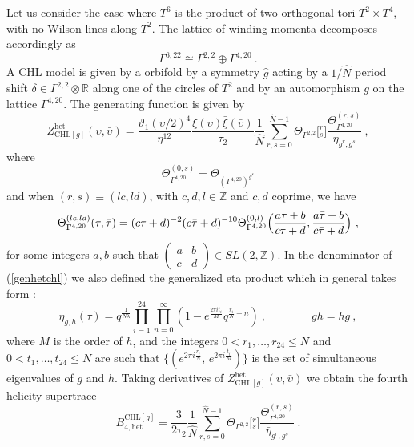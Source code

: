 \documentclass[a4paper,11pt]{article}
\newcommand{\RR}{\mathbb{R}}
\newcommand{\ZZ}{\mathbb{Z}}
\numberwithin{equation}{section}
\def\be{\begin{equation}}
\def\ee{\end{equation}}
\begin{document}
Let us consider the case where $T^6$ is the product of two orthogonal tori $T^2\times T^4$, with no Wilson lines along $T^2$. The lattice of winding momenta  decomposes accordingly as
\be \Gamma^{6,22}\cong \Gamma^{2,2}\oplus \Gamma^{4,20}\ .
\ee A CHL model is given by a orbifold by a symmetry $\hat g$ acting by a $1/\hat N$ period shift $\delta\in \Gamma^{2,2}\otimes \RR$ along one of the circles of $T^2$ and by an automorphism $g$ on the lattice $\Gamma^{4,20}$. The generating function is given by
\be Z^{\text{het}}_{\text{CHL}[g]}(\upsilon,\bar\upsilon)=
\frac{\vartheta_1(\upsilon/2)^4  }{\eta^{12}}\frac{\xi(\upsilon)\bar\xi(\bar\upsilon)}{\tau_2}\frac{1}{\hat N}\sum_{r,s=0}^{\hat N-1}\Theta_{\Gamma^{2,2}}\bigl[{}^{r}_{s}\bigr]\frac{\Theta_{\Gamma^{4,20}}^{(r,s)}}{\bar\eta_{g^r,g^s}}\ ,
\label{genhetchl}
\ee where
\be \Theta_{\Gamma^{4,20}}^{(0,s)}=\Theta_{(\Gamma^{4,20})^{g^s}}
\ee
and when $(r,s)\equiv (lc,ld)$, with $c,d,l\in \ZZ$ and $c,d$ coprime, we have
\be \Theta_{\Gamma^{4,20}}^{(lc,ld)}(\tau,\bar\tau)=(c\tau+d)^{-2}(c\bar \tau+d)^{-10}\Theta_{\Gamma^{4,20}}^{(0,l)}\Bigl(\frac{a\tau+b}{c\tau+d},\frac{a\bar\tau+b}{c\bar\tau+d}\Bigr)\ ,
\ee for some integers $a,b$ such that $\left(\begin{smallmatrix}
a & b\\ c& d
\end{smallmatrix}\right)\in SL(2,\ZZ)$. In the denominator of (\ref{genhetchl}) we also defined the generalized eta product which in general takes form \cite{Persson:2013xpa}:
 \be\label{etagh} \eta_{g,h}(\tau)=q^{\frac{1}{N\lambda}}\prod_{i=1}^{24}\prod_{n=0}^\infty (1-e^{\frac{2\pi it_i}{M}}q^{\frac{r_i}{N}+n})\ ,\qquad\qquad  gh=hg\ ,
 \ee
where $M$ is the order of $h$, and the integers $0<r_1,\ldots,r_{24}\le N$ and $0<t_1,\ldots,t_{24}\le N$ are such that $\{(e^{2\pi i\frac{r_i}{N}},\,e^{2\pi i\frac{t_i}{M}})\}$ is the set of simultaneous eigenvalues of $g$ and $h$. Taking derivatives of $Z^{\text{het}}_{\text{CHL}[g]}(\upsilon,\bar\upsilon)$ we obtain the fourth helicity supertrace
\be B^{\text{CHL}[g]}_{4, \text{het}}=\frac{3}{2\tau_2}\frac{1}{\hat N}\sum_{r,s=0}^{\hat N-1}\Theta_{\Gamma^{2,2}}\bigl[{}^{r}_{s}\bigr]\frac{\Theta_{\Gamma^{4,20}}^{(r,s)}}{\bar\eta_{g^r,g^s}}\ .
\ee
\end{document}
